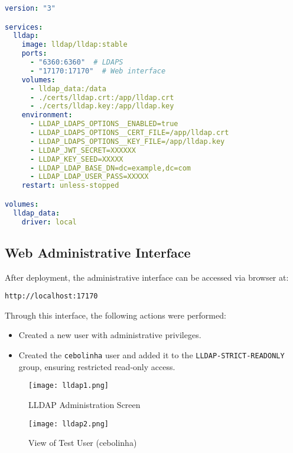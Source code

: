 \documentclass[12pt]{report}
\begin{document}
\begin{lstlisting}[language=yaml, caption={LLDAP docker-compose.yml File}]
version: "3"

services:
  lldap:
    image: lldap/lldap:stable
    ports:
      - "6360:6360"  # LDAPS
      - "17170:17170"  # Web interface
    volumes:
      - lldap_data:/data
      - ./certs/lldap.crt:/app/lldap.crt
      - ./certs/lldap.key:/app/lldap.key
    environment:
      - LLDAP_LDAPS_OPTIONS__ENABLED=true
      - LLDAP_LDAPS_OPTIONS__CERT_FILE=/app/lldap.crt
      - LLDAP_LDAPS_OPTIONS__KEY_FILE=/app/lldap.key
      - LLDAP_JWT_SECRET=XXXXXX
      - LLDAP_KEY_SEED=XXXXX
      - LLDAP_LDAP_BASE_DN=dc=example,dc=com
      - LLDAP_LDAP_USER_PASS=XXXXX
    restart: unless-stopped

volumes:
  lldap_data:
    driver: local
\end{lstlisting}

\subsection*{Web Administrative Interface}

After deployment, the administrative interface can be accessed via browser at:

\begin{center}
\texttt{http://localhost:17170}
\end{center}

Through this interface, the following actions were performed:

\begin{itemize}
    \item Created a new user with administrative privileges.
    \item Created the \texttt{cebolinha} user and added it to the \texttt{LLDAP-STRICT-READONLY} group, ensuring restricted read-only access.
\end{itemize}

\begin{figure}[h]
    \centering
    \texttt{[image: lldap1.png]}
    \caption{LLDAP Administration Screen}
    \label{fig:lldap-admin}
\end{figure}

\begin{figure}[h]
    \centering
    \texttt{[image: lldap2.png]}
    \caption{View of Test User (cebolinha)}
    \label{fig:lldap-user}
\end{figure}
\end{document}
